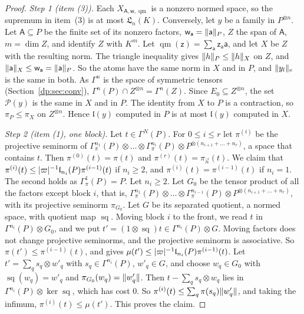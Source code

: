 \begin{proof}
\emph{Step 1 (item (3)).} Each $X_{\mathsf A,\mathsf w,\operatorname{qm}}$ is a nonzero normed space, so the supremum in item~(3) is at most $\mathfrak L_n(K)$. Conversely, let $y$ be a family in $P^{\otimes n}$. Let $\mathsf A\subseteq P$ be the finite set of its nonzero factors, $\mathsf w_{\mathsf a}=\lVert \mathsf a\rVert_P$, $Z$ the span of $\mathsf A$, $m=\dim Z$, and identify $Z$ with $K^m$. Let $\operatorname{qm}(\mathsf z)=\sum_{\mathsf a}\mathsf z_{\mathsf a}\mathsf a$, and let $X$ be $Z$ with the resulting norm. The triangle inequality gives $\lVert h\rVert_P\le\lVert h\rVert_X$ on $Z$, and $\lVert \mathsf a\rVert_X\le\mathsf w_{\mathsf a}=\lVert \mathsf a\rVert_P$. So the atoms have the same norm in $X$ and in $P$, and $\lVert y_l\rVert_{\rm e}$ is the same in both. As $\Gamma^n$ is the space of symmetric tensors (Section~\ref{dp:sec:conv}), $\Gamma^n(P)\cap Z^{\otimes n}=\Gamma^n(Z)$. Since $E_0\subseteq Z^{\otimes n}$, the set $\mathcal P(y)$ is the same in $X$ and in $P$. The identity from $X$ to $P$ is a contraction, so $\pi_P\le\pi_X$ on $Z^{\otimes n}$. Hence $\mathfrak l(y)$ computed in $P$ is at most $\mathfrak l(y)$ computed in $X$.

\emph{Step 2 (item (1), one block).} Let $t\in\Gamma^N(P)$. For $0\le i\le r$ let $\pi^{(i)}$ be the projective seminorm of $\Gamma^{n_1}_\pi(P)\otimes\dots\otimes\Gamma^{n_i}_\pi(P)\otimes P^{\otimes(n_{i+1}+\dots+n_r)}$, a space that contains $t$. Then $\pi^{(0)}(t)=\pi(t)$ and $\pi^{(r)}(t)=\pi_{\vec n}(t)$. We claim that $\pi^{(i)}(t)\le\lvert \varpi\rvert^{-1}\mathfrak l_{n_i}(P)\pi^{(i-1)}(t)$ if $n_i\ge2$, and $\pi^{(i)}(t)=\pi^{(i-1)}(t)$ if $n_i=1$. The second holds as $\Gamma^1_\pi(P)=P$. Let $n_i\ge2$. Let $G_0$ be the tensor product of all the factors except block $i$, that is, $\Gamma^{n_1}_\pi(P)\otimes\dots\otimes\Gamma^{n_{i-1}}_\pi(P)\otimes P^{\otimes(n_{i+1}+\dots+n_r)}$, with its projective seminorm $\pi_{G_0}$. Let $G$ be its separated quotient, a normed space, with quotient map $\operatorname{sq}$. Moving block $i$ to the front, we read $t$ in $\Gamma^{n_i}(P)\otimes G_0$, and we put $t'=(1\otimes\operatorname{sq})t\in\Gamma^{n_i}(P)\otimes G$. Moving factors does not change projective seminorms, and the projective seminorm is associative. So $\pi(t')\le\pi^{(i-1)}(t)$, and \cite[Lemma~Q.7(2)]{I} gives $\mu(t')\le\lvert \varpi\rvert^{-1}\mathfrak l_{n_i}(P)\pi^{(i-1)}(t)$. Let $t'=\sum_qs_q\otimes w'_q$ with $s_q\in\Gamma^{n_i}(P)$, $w'_q\in G$, and choose $w_q\in G_0$ with $\operatorname{sq}(w_q)=w'_q$ and $\pi_{G_0}(w_q)=\lVert w'_q\rVert$. Then $t-\sum_qs_q\otimes w_q$ lies in $\Gamma^{n_i}(P)\otimes\ker\operatorname{sq}$, which has cost $0$. So $\pi^{(i)}(t)\le\sum_q\pi(s_q)\lVert w'_q\rVert$, and taking the infimum, $\pi^{(i)}(t)\le\mu(t')$. This proves the claim.


\end{proof}
